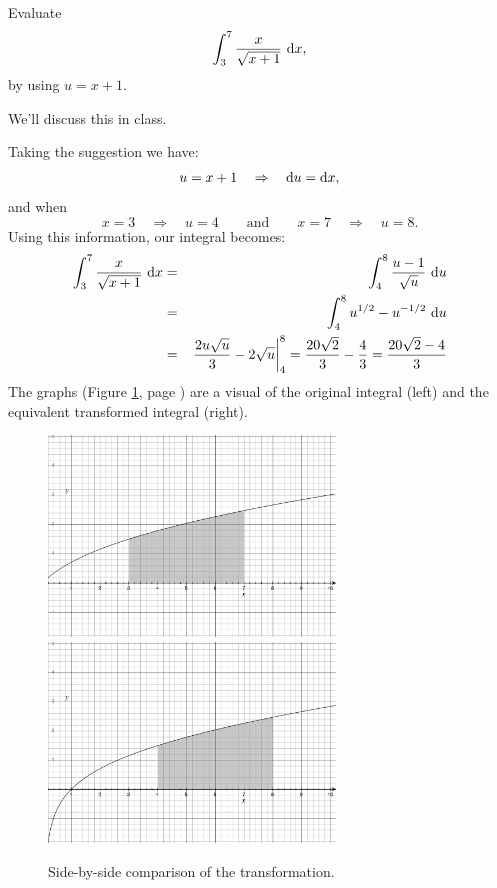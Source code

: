 \documentclass[12pt,addpoints, answers, fleqn]{exam}
\begin{document}
\begin{questions}
\question Evaluate
\[
\int_{3}^{7} \frac{x}{\sqrt{x+1}} \ {\rm{d}} x,
\]
by using $u = x+1$.

\begin{solution}
We'll discuss this in class.

Taking the suggestion we have:
\[
u = x+1 \quad \Rightarrow \quad {\rm{d}} u = {\rm{d}} x,
\]
and when
\[
x=3 \quad \Rightarrow \quad u = 4 \qquad \mbox{and}\qquad
x=7 \quad \Rightarrow \quad u = 8. 
\]
Using this information, our integral becomes:
\begin{eqnarray*}
\int_{3}^{7} \frac{x}{\sqrt{x+1}} \ {\rm{d}} x &=& \int_{4}^{8} \frac{u-1}{\sqrt{u}}  \ {\rm{d}} u\\
&=& \int_{4}^{8} u^{1/2} - u^{-1/2}  \ {\rm{d}} u\\
&=& \left. \frac{ 2 u \sqrt{u} }{3} -2\sqrt{u} \right|_4^8 = \frac{20\sqrt{2}}{3} - \frac{4}{3} = \frac{20\sqrt{2} -4}{3}
\end{eqnarray*}
The graphs (Figure \ref{fig:graph3007}, page \pageref{fig:graph3007}) are a visual of the original integral (left) and the equivalent transformed integral (right). 
\end{solution}
\begin{figure}[htbp] %
   \centering
   \includegraphics[width=3in]{./graphics/graph3007.pdf}
   \includegraphics[width=3in]{./graphics/graph3008.pdf} 
   \caption{Side-by-side comparison of the transformation.}
   \label{fig:graph3007}
\end{figure}



\end{questions}
\end{document}
